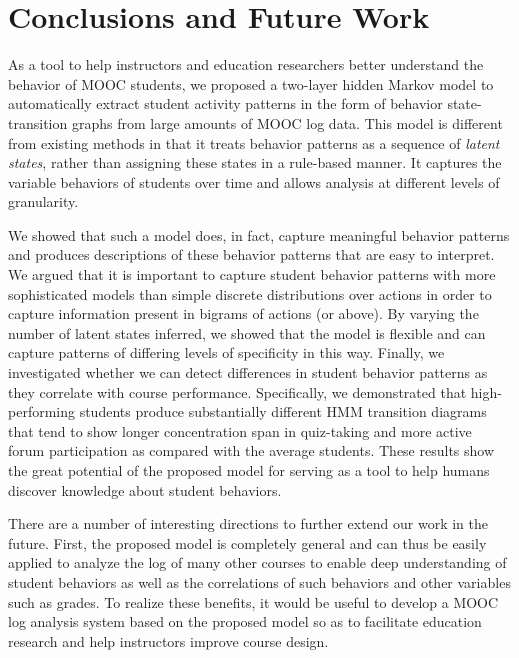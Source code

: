 \section{Conclusions and Future Work}
As a tool to help instructors and education researchers better understand
the behavior of MOOC students, we proposed a two-layer hidden Markov model
to automatically extract student activity patterns in the form of behavior
state-transition graphs from large amounts of MOOC log data. This model is
different from existing methods in that it treats behavior patterns as a
sequence of \emph{latent states}, rather than assigning these states in a
rule-based manner. It captures the variable behaviors of students over time
and allows analysis at different levels of granularity.

We showed that such a model does, in fact, capture meaningful behavior
patterns and produces descriptions of these behavior patterns that are easy
to interpret. We argued that it is important to capture student behavior
patterns with more sophisticated models than simple discrete distributions
over actions in order to capture information present in bigrams of actions
(or above). By varying the number of latent
states inferred, we showed that the model is flexible and can capture
patterns of differing levels of specificity in this way.  Finally, we
investigated whether we can detect differences in student behavior patterns
as they correlate with course performance. Specifically, we demonstrated
that high-performing students produce substantially different HMM
transition diagrams that tend to show longer concentration span in quiz-taking
and more active  forum participation as compared with the average students.
These results show the great potential of the proposed model for serving as a tool
to help humans discover knowledge about student behaviors.  


There are a number of interesting directions to further extend our work in the future. 
First, the proposed model is 
completely general and can thus be easily applied to analyze the log of many
other courses to enable deep understanding of student behaviors as well as
the correlations of such behaviors and other variables such as grades. To realize these benefits, 
it would be useful 
to develop a MOOC log analysis system based on the proposed model so as to facilitate education research and help instructors improve course
design.

